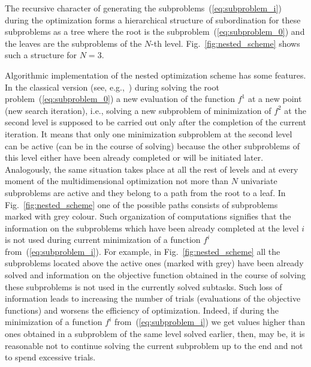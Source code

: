 \documentclass[preprint]{elsarticle}
\begin{document}
The recursive character of generating the subproblems~(\ref{eq:subproblem_i}) during the optimization forms a hierarchical structure of subordination for these subproblems as a tree where the root is the subproblem~(\ref{eq:subproblem_0}) and the leaves are the
subproblems of the $N$-th level. Fig.~\ref{fig:nested_scheme} shows such a structure for $N = 3$.

Algorithmic implementation of the nested optimization scheme has some features. In the classical version (see, e.g.,~\cite{bib5,bib31}) during solving the root problem~(\ref{eq:subproblem_0}) a new evaluation of the function $f^1$ at a new point (new search iteration), i.e., solving a new subproblem of minimization of $f^2$ at the second level is supposed to be carried out only after the completion of the current iteration. It means that only one minimization subproblem at the second level can be active (can be in the course of solving) because the other subproblems of this level either have been already completed or will be initiated later. Analogously, the same situation takes place at all the rest of levels and at every moment of the multidimensional optimization not more than $N$ univariate subproblems are active and they belong to a path from the root to a leaf. In Fig.~\ref{fig:nested_scheme} one of the possible paths consists of subproblems marked with grey colour. Such organization of computations signifies that the information on the subproblems which have been already completed at the level $i$ is not used during current minimization of a function $f^i$ from~(\ref{eq:subproblem_i}). For example, in Fig.~\ref{fig:nested_scheme} all the subproblems located above the active ones (marked with grey) have been already solved and information on the objective function obtained in the course of solving these subproblems is not used in the currently solved subtasks. Such loss of information leads to increasing the number of trials (evaluations of the objective functions) and worsens the efficiency of optimization. Indeed, if during the minimization of a function $f^i$ from~(\ref{eq:subproblem_i}) we get values higher than ones obtained in a subproblem of the same level solved earlier, then, may be, it is reasonable not to continue solving the current subproblem up to the end and not to spend excessive trials.
\end{document}
